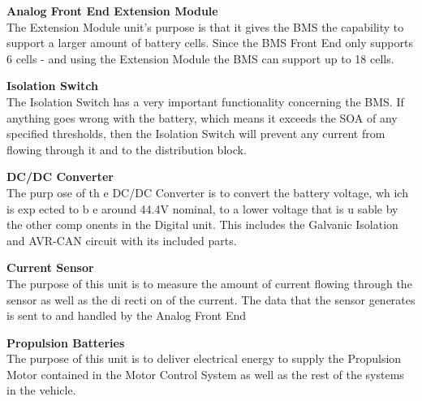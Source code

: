 \textbf{Analog Front End Extension Module}\\
The Extension Module unit's purpose is that it gives the BMS the capability to support a
larger amount of battery cells. Since the BMS Front End only supports 6 cells - and using
the Extension Module the BMS can support up to 18 cells. 

\textbf{Isolation Switch}\\
The Isolation Switch has a very important functionality concerning the BMS. If anything
goes wrong with the battery, which means it exceeds the SOA of any specified thresholds,
then the Isolation Switch will prevent any current from flowing through it and to the
distribution block.

\textbf{DC/DC Converter}\\
The purp ose of th e DC/DC Converter is to convert the battery voltage, wh ich is exp ected
to b e around 44.4V nominal, to a lower voltage that is u sable by the other comp onents
in the Digital unit. This includes the Galvanic Isolation and AVR-CAN circuit with its
included parts.

\textbf{Current Sensor}\\
The purpose of this unit is to measure the amount of current flowing through the sensor
as well as the di recti on of the current. The data that the sensor generates is sent to and
handled by the Analog Front End

\textbf{Propulsion Batteries}\\
The purpose of this unit is to deliver electrical energy to supply the Propulsion Motor contained in the Motor Control System as well as the rest of the systems in the vehicle.